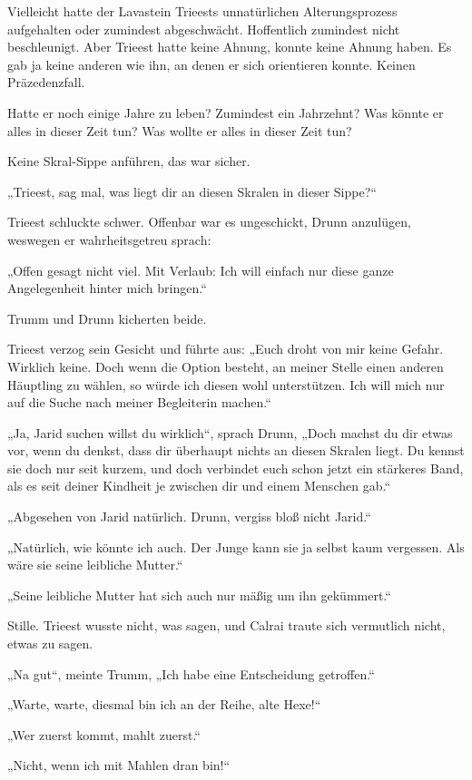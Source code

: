 Vielleicht hatte der Lavastein Trieests unnatürlichen Alterungsprozess aufgehalten oder zumindest abgeschwächt. Hoffentlich zumindest nicht beschleunigt. Aber Trieest hatte keine Ahnung, konnte keine Ahnung haben. Es gab ja keine anderen wie ihn, an denen er sich orientieren konnte. Keinen Präzedenzfall.

Hatte er noch einige Jahre zu leben? Zumindest ein Jahrzehnt? Was könnte er alles in dieser Zeit tun? Was wollte er alles in dieser Zeit tun?

Keine Skral-Sippe anführen, das war sicher.

„Trieest, sag mal, was liegt dir an diesen Skralen in dieser Sippe?“

Trieest schluckte schwer. Offenbar war es ungeschickt, Drunn anzulügen, weswegen er wahrheitsgetreu sprach:

„Offen gesagt nicht viel. Mit Verlaub: Ich will einfach nur diese ganze Angelegenheit hinter mich bringen.“

Trumm und Drunn kicherten beide.

Trieest verzog sein Gesicht und führte aus: „Euch droht von mir keine Gefahr. Wirklich keine. Doch wenn die Option besteht, an meiner Stelle einen anderen Häuptling zu wählen, so würde ich diesen wohl unterstützen. Ich will mich nur auf die Suche nach meiner Begleiterin machen.“

„Ja, Jarid suchen willst du wirklich“, sprach Drunn, „Doch machst du dir etwas vor, wenn du denkst, dass dir überhaupt nichts an diesen Skralen liegt. Du kennst sie doch nur seit kurzem, und doch verbindet euch schon jetzt ein stärkeres Band, als es seit deiner Kindheit je zwischen dir und einem Menschen gab.“

„Abgesehen von Jarid natürlich. Drunn, vergiss bloß nicht Jarid.“

„Natürlich, wie könnte ich auch. Der Junge kann sie ja selbst kaum vergessen. Als wäre sie seine leibliche Mutter.“

„Seine leibliche Mutter hat sich auch nur mäßig um ihn gekümmert.“

Stille. Trieest wusste nicht, was sagen, und Calrai traute sich vermutlich nicht, etwas zu sagen.

„Na gut“, meinte Trumm, „Ich habe eine Entscheidung getroffen.“

„Warte, warte, diesmal bin ich an der Reihe, alte Hexe!“

„Wer zuerst kommt, mahlt zuerst.“

„Nicht, wenn ich mit Mahlen dran bin!“

